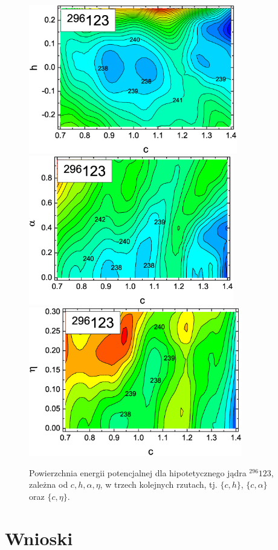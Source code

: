 \documentclass[a4paper,polish,twoside]{article}
\numberwithin{equation}{section}
\begin{document}
\begin{figure}[ht!]
\centering
\includegraphics[height=6.5cm]{296_123_c_h.eps}
\includegraphics[height=6.5cm]{296_123_c_alpha.eps}
\includegraphics[height=6.5cm]{296_123_c_eta.eps}
\caption{Powierzchnia energii potencjalnej dla hipotetycznego jądra $^{296}123$, zależna od $c,h,\alpha,\eta$, w trzech kolejnych rzutach, tj. $\{c,h\}$, $\{c,\alpha\}$ oraz $\{c,\eta\}$. }
\label{123}
\end{figure}

\clearpage
\section{Wnioski}
\end{document}
